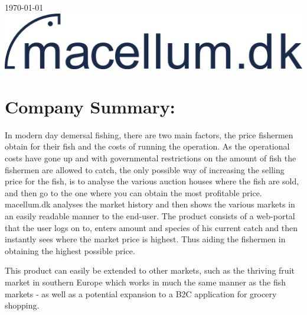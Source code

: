 \documentclass[12pt]{article}
\begin{document}
\begin{titlepage}

{\large \today}\\[2cm] %


\includegraphics[width=\textwidth]{logo}\\[1cm] %
 

\vfill %

\end{titlepage}


\section{Company Summary:}
In modern day demersal fishing, there are two main factors, the price fishermen obtain for their fish and the costs of running the operation. As the operational costs have gone up and with governmental restrictions on the amount of fish the fishermen are allowed to catch, the only possible way of increasing the selling price for the fish, is to analyse the various auction houses where the fish are sold, and then go to the one where you can obtain the most profitable price. macellum.dk analyses the market history and then shows the various markets in an easily readable manner to the end-user. The product consists of a web-portal that the user logs on to, enters amount and species of his current catch and then instantly sees where the market price is highest. Thus aiding the fishermen in obtaining the highest possible price. 

This product can easily be extended to other markets, such as the thriving fruit market in southern Europe which works in much the same manner as the fish markets - as well as a potential expansion to a B2C application for grocery shopping.
\end{document}

